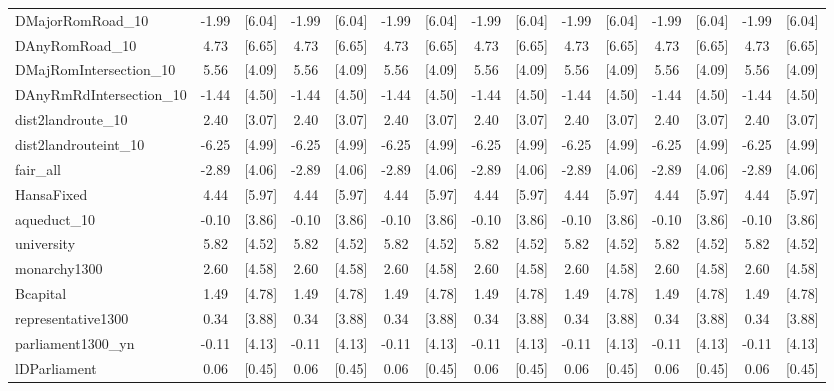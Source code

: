 \documentclass[landscape]{article}
\begin{document}
\begin{tabular}{lcccccccccccccc}
DMajorRomRoad\_10 & -1.99 & [6.04] & -1.99 & [6.04] & -1.99 & [6.04] & -1.99 & [6.04] & -1.99 & [6.04] & -1.99 & [6.04] & -1.99 & [6.04] \\
DAnyRomRoad\_10 & 4.73 & [6.65] & 4.73 & [6.65] & 4.73 & [6.65] & 4.73 & [6.65] & 4.73 & [6.65] & 4.73 & [6.65] & 4.73 & [6.65] \\
DMajRomIntersection\_10 & 5.56 & [4.09] & 5.56 & [4.09] & 5.56 & [4.09] & 5.56 & [4.09] & 5.56 & [4.09] & 5.56 & [4.09] & 5.56 & [4.09] \\
DAnyRmRdIntersection\_10 & -1.44 & [4.50] & -1.44 & [4.50] & -1.44 & [4.50] & -1.44 & [4.50] & -1.44 & [4.50] & -1.44 & [4.50] & -1.44 & [4.50] \\
dist2landroute\_10 & 2.40 & [3.07] & 2.40 & [3.07] & 2.40 & [3.07] & 2.40 & [3.07] & 2.40 & [3.07] & 2.40 & [3.07] & 2.40 & [3.07] \\
dist2landrouteint\_10 & -6.25 & [4.99] & -6.25 & [4.99] & -6.25 & [4.99] & -6.25 & [4.99] & -6.25 & [4.99] & -6.25 & [4.99] & -6.25 & [4.99] \\
fair\_all & -2.89 & [4.06] & -2.89 & [4.06] & -2.89 & [4.06] & -2.89 & [4.06] & -2.89 & [4.06] & -2.89 & [4.06] & -2.89 & [4.06] \\
HansaFixed & 4.44 & [5.97] & 4.44 & [5.97] & 4.44 & [5.97] & 4.44 & [5.97] & 4.44 & [5.97] & 4.44 & [5.97] & 4.44 & [5.97] \\
aqueduct\_10 & -0.10 & [3.86] & -0.10 & [3.86] & -0.10 & [3.86] & -0.10 & [3.86] & -0.10 & [3.86] & -0.10 & [3.86] & -0.10 & [3.86] \\
university & 5.82 & [4.52] & 5.82 & [4.52] & 5.82 & [4.52] & 5.82 & [4.52] & 5.82 & [4.52] & 5.82 & [4.52] & 5.82 & [4.52] \\
monarchy1300 & 2.60 & [4.58] & 2.60 & [4.58] & 2.60 & [4.58] & 2.60 & [4.58] & 2.60 & [4.58] & 2.60 & [4.58] & 2.60 & [4.58] \\
Bcapital & 1.49 & [4.78] & 1.49 & [4.78] & 1.49 & [4.78] & 1.49 & [4.78] & 1.49 & [4.78] & 1.49 & [4.78] & 1.49 & [4.78] \\
representative1300 & 0.34 & [3.88] & 0.34 & [3.88] & 0.34 & [3.88] & 0.34 & [3.88] & 0.34 & [3.88] & 0.34 & [3.88] & 0.34 & [3.88] \\
parliament1300\_yn & -0.11 & [4.13] & -0.11 & [4.13] & -0.11 & [4.13] & -0.11 & [4.13] & -0.11 & [4.13] & -0.11 & [4.13] & -0.11 & [4.13] \\
lDParliament & 0.06 & [0.45] & 0.06 & [0.45] & 0.06 & [0.45] & 0.06 & [0.45] & 0.06 & [0.45] & 0.06 & [0.45] & 0.06 & [0.45] \\

\end{tabular}
\end{document}
